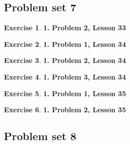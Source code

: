 \documentclass{article}
\theoremstyle{definition}
\newtheorem*{exer*}{Exercise}
\begin{document}
\newpage
\subsection{Problem set 7}



\begin{exer*}\textbf{1. Problem 2, Lesson 33} 
	
\end{exer*}
\newpage

\begin{exer*}\textbf{1. Problem 1, Lesson 34} 
	
\end{exer*}
\newpage

\begin{exer*}\textbf{1. Problem 2, Lesson 34} 
	
\end{exer*}
\newpage

\begin{exer*}\textbf{1. Problem 3, Lesson 34} 
	
\end{exer*}
\newpage

\begin{exer*}\textbf{1. Problem 1, Lesson 35} 
	
\end{exer*}
\newpage

\begin{exer*}\textbf{1. Problem 2, Lesson 35} 
	
\end{exer*}


\newpage
\subsection{Problem set 8}
\end{document}

